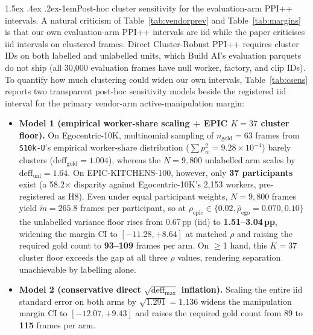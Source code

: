 \documentclass[11pt]{article}
\makeatletter
\renewcommand\paragraph{\@startsection{paragraph}{4}{\z@}%
  {1.5ex \@plus .4ex \@minus .2ex}{-1em}{\normalfont\normalsize\bfseries}}
\makeatother
\begin{document}
\paragraph{Post-hoc cluster sensitivity for the evaluation-arm PPI++ intervals.}
A natural criticism of Table~\ref{tab:vendorprev} and Table~\ref{tab:margins} is that our own
evaluation-arm PPI++ intervals are iid while the paper criticises iid intervals on clustered
frames. Direct Cluster-Robust PPI++ \citep{broska2026crppi} requires cluster IDs on both labelled
and unlabelled units, which Build AI's evaluation parquets do not ship (all 30{,}000 evaluation
frames have null worker, factory, and clip IDs). To quantify how much clustering could widen our
own intervals, Table~\ref{tab:csens} reports two transparent post-hoc sensitivity models beside
the registered iid interval for the primary vendor-arm active-manipulation margin:
\begin{itemize}
\item \textbf{Model 1 (empirical worker-share scaling + EPIC $K=37$ cluster floor).} On
      Egocentric-10K, multinomial sampling of $n_{\text{gold}}=63$ frames from \texttt{S10k-U}'s
      empirical worker-share distribution ($\sum p_w^2 = 9.28\times 10^{-4}$) barely clusters
      ($\text{deff}_{\text{gold}} = 1.004$), whereas the $N=9{,}800$ unlabelled arm scales by
      $\text{deff}_{\text{unl}} = 1.64$. On EPIC-KITCHENS-100, however, only \textbf{37
      participants} exist (a 58.2$\times$ disparity against Egocentric-10K's 2{,}153 workers,
      pre-registered as H8). Even under equal participant weights, $N=9{,}800$ frames yield
      $\tilde{m} = 265.8$ frames per participant, so at $\rho_{\text{epic}} \in \{0.02,
      \hat{\rho}_{\text{ego}}=0.070, 0.10\}$ the unlabelled variance floor rises from 0.67\,pp
      (iid) to \textbf{1.51--3.04\,pp}, widening the margin CI to $[-11.28, +8.64]$ at matched
      $\rho$ and raising the required gold count to \textbf{93--109} frames per arm. On $\geq$1
      hand, this $K=37$ cluster floor exceeds the gap at all three $\rho$ values, rendering
      separation unachievable by labelling alone.
\item \textbf{Model 2 (conservative direct $\sqrt{\text{deff}_{\max}}$ inflation).} Scaling the
      entire iid standard error on both arms by $\sqrt{1.291} = 1.136$ widens the manipulation
      margin CI to $[-12.07, +9.43]$ and raises the required gold count from 89 to \textbf{115}
      frames per arm.
\end{itemize}
\end{document}
